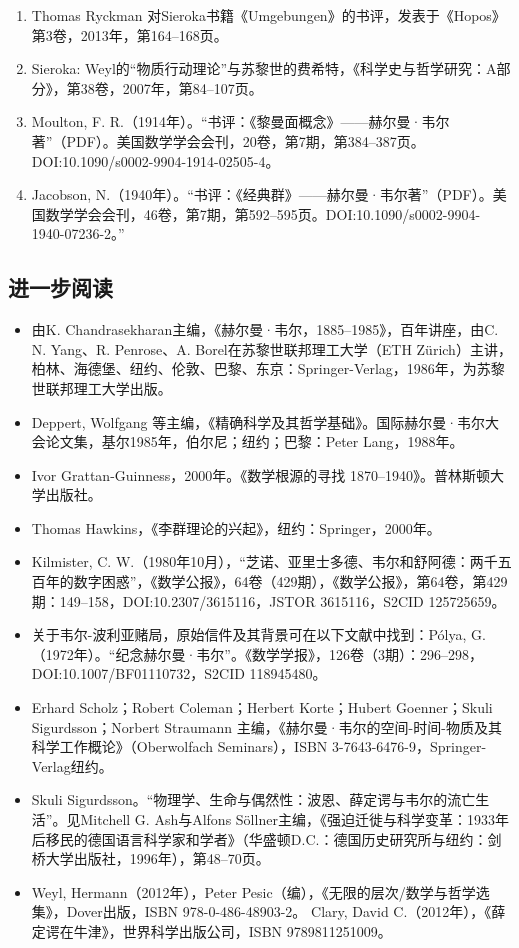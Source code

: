\begin{enumerate}
\item Thomas Ryckman 对Sieroka书籍《Umgebungen》的书评，发表于《Hopos》第3卷，2013年，第164–168页。
\item Sieroka: Weyl的“物质行动理论”与苏黎世的费希特，《科学史与哲学研究：A部分》，第38卷，2007年，第84–107页。
\item Moulton, F. R.（1914年）。“书评：《黎曼面概念》——赫尔曼·韦尔著”（PDF）。美国数学学会会刊，20卷，第7期，第384–387页。DOI:10.1090/s0002-9904-1914-02505-4。
\item Jacobson, N.（1940年）。“书评：《经典群》——赫尔曼·韦尔著”（PDF）。美国数学学会会刊，46卷，第7期，第592–595页。DOI:10.1090/s0002-9904-1940-07236-2。”
\end{enumerate}
\subsection{进一步阅读}  
\begin{itemize}
\item 由K. Chandrasekharan主编，《赫尔曼·韦尔，1885–1985》，百年讲座，由C. N. Yang、R. Penrose、A. Borel在苏黎世联邦理工大学（ETH Zürich）主讲，柏林、海德堡、纽约、伦敦、巴黎、东京：Springer-Verlag，1986年，为苏黎世联邦理工大学出版。  
\item Deppert, Wolfgang 等主编，《精确科学及其哲学基础》。国际赫尔曼·韦尔大会论文集，基尔1985年，伯尔尼；纽约；巴黎：Peter Lang，1988年。  
\item Ivor Grattan-Guinness，2000年。《数学根源的寻找 1870–1940》。普林斯顿大学出版社。  
\item Thomas Hawkins，《李群理论的兴起》，纽约：Springer，2000年。  
\item Kilmister, C. W.（1980年10月），“芝诺、亚里士多德、韦尔和舒阿德：两千五百年的数字困惑”，《数学公报》，64卷（429期），《数学公报》，第64卷，第429期：149–158，DOI:10.2307/3615116，JSTOR 3615116，S2CID 125725659。  
\item 关于韦尔-波利亚赌局，原始信件及其背景可在以下文献中找到：Pólya, G.（1972年）。“纪念赫尔曼·韦尔”。《数学学报》，126卷（3期）：296–298，DOI:10.1007/BF01110732，S2CID 118945480。  
\item Erhard Scholz；Robert Coleman；Herbert Korte；Hubert Goenner；Skuli Sigurdsson；Norbert Straumann 主编，《赫尔曼·韦尔的空间-时间-物质及其科学工作概论》（Oberwolfach Seminars），ISBN 3-7643-6476-9，Springer-Verlag纽约。  
\item Skuli Sigurdsson。“物理学、生命与偶然性：波恩、薛定谔与韦尔的流亡生活”。见Mitchell G. Ash与Alfons Söllner主编，《强迫迁徙与科学变革：1933年后移民的德国语言科学家和学者》（华盛顿D.C.：德国历史研究所与纽约：剑桥大学出版社，1996年），第48–70页。  
\item Weyl, Hermann（2012年），Peter Pesic（编），《无限的层次/数学与哲学选集》，Dover出版，ISBN 978-0-486-48903-2。  
Clary, David C.（2012年），《薛定谔在牛津》，世界科学出版公司，ISBN 9789811251009。
\end{itemize}

